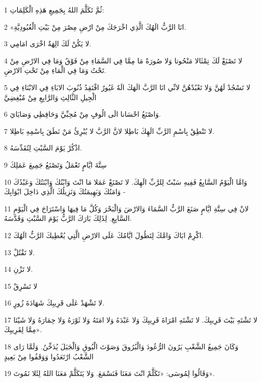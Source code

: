 \par 1 ثُمَّ تَكَلَّمَ اللهُ بِجَمِيعِ هَذِهِ الْكَلِمَاتِ:
\par 2 «انَا الرَّبُّ الَهُكَ الَّذِي اخْرَجَكَ مِنْ ارْضِ مِصْرَ مِنْ بَيْتِ الْعُبُودِيَّةِ.
\par 3 لا يَكُنْ لَكَ الِهَةٌ اخْرَى امَامِي.
\par 4 لا تَصْنَعْ لَكَ تِمْثَالا مَنْحُوتا وَلا صُورَةً مَا مِمَّا فِي السَّمَاءِ مِنْ فَوْقُ وَمَا فِي الارْضِ مِنْ تَحْتُ وَمَا فِي الْمَاءِ مِنْ تَحْتِ الارْضِ.
\par 5 لا تَسْجُدْ لَهُنَّ وَلا تَعْبُدْهُنَّ لانِّي انَا الرَّبَّ الَهَكَ الَهٌ غَيُورٌ افْتَقِدُ ذُنُوبَ الابَاءِ فِي الابْنَاءِ فِي الْجِيلِ الثَّالِثِ وَالرَّابِعِ مِنْ مُبْغِضِيَّ
\par 6 وَاصْنَعُ احْسَانا الَى الُوفٍ مِنْ مُحِبِّيَّ وَحَافِظِي وَصَايَايَ.
\par 7 لا تَنْطِقْ بِاسْمِ الرَّبِّ الَهِكَ بَاطِلا لانَّ الرَّبَّ لا يُبْرِئُ مَنْ نَطَقَ بِاسْمِهِ بَاطِلا.
\par 8 اذْكُرْ يَوْمَ السَّبْتِ لِتُقَدِّسَهُ.
\par 9 سِتَّةَ ايَّامٍ تَعْمَلُ وَتَصْنَعُ جَمِيعَ عَمَلِكَ
\par 10 وَامَّا الْيَوْمُ السَّابِعُ فَفِيهِ سَبْتٌ لِلرَّبِّ الَهِكَ. لا تَصْنَعْ عَمَلا مَا انْتَ وَابْنُكَ وَابْنَتُكَ وَعَبْدُكَ وَامَتُكَ وَبَهِيمَتُكَ وَنَزِيلُكَ الَّذِي دَاخِلَ ابْوَابِكَ -
\par 11 لانْ فِي سِتَّةِ ايَّامٍ صَنَعَ الرَّبُّ السَّمَاءَ وَالارْضَ وَالْبَحْرَ وَكُلَّ مَا فِيهَا وَاسْتَرَاحَ فِي الْيَوْمِ السَّابِعِ. لِذَلِكَ بَارَكَ الرَّبُّ يَوْمَ السَّبْتِ وَقَدَّسَهُ.
\par 12 اكْرِمْ ابَاكَ وَامَّكَ لِتَطُولَ ايَّامُكَ عَلَى الارْضِ الَّتِي يُعْطِيكَ الرَّبُّ الَهُكَ.
\par 13 لا تَقْتُلْ.
\par 14 لا تَزْنِ.
\par 15 لا تَسْرِقْ
\par 16 لا تَشْهَدْ عَلَى قَرِيبِكَ شَهَادَةَ زُورٍ.
\par 17 لا تَشْتَهِ بَيْتَ قَرِيبِكَ. لا تَشْتَهِ امْرَاةَ قَرِيبِكَ وَلا عَبْدَهُ وَلا امَتَهُ وَلا ثَوْرَهُ وَلا حِمَارَهُ وَلا شَيْئا مِمَّا لِقَرِيبِكَ».
\par 18 وَكَانَ جَمِيعُ الشَّعْبِ يَرُونَ الرُّعُودَ وَالْبُرُوقَ وَصَوْتَ الْبُوقِ وَالْجَبَلَ يُدَخِّنُ. وَلَمَّا رَاى الشَّعْبُ ارْتَعَدُوا وَوَقَفُوا مِنْ بَعِيدٍ
\par 19 وَقَالُوا لِمُوسَى: «تَكَلَّمْ انْتَ مَعَنَا فَنَسْمَعَ. وَلا يَتَكَلَّمْ مَعَنَا اللهُ لِئَلا نَمُوتَ».
